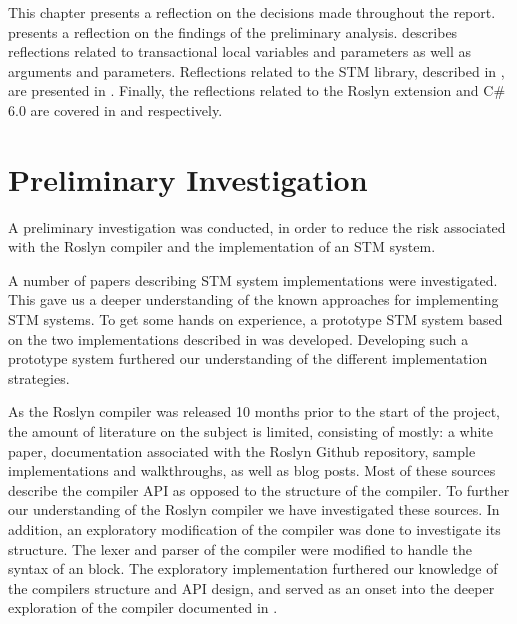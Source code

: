\makeatletter {}\makeatother
{}
\label{chap:reflection}
This chapter presents a reflection on the decisions made throughout the report.  presents a reflection on the findings of the preliminary analysis.  describes reflections related to transactional local variables and parameters as well as  arguments and parameters. Reflections related to the \ac{STM} library, described in , are presented in . Finally, the reflections related to the Roslyn extension and C\# 6.0 are covered in  and  respectively.

\section{Preliminary Investigation}\label{sec:reflection_preliminary}
A preliminary investigation was conducted, in order to reduce the risk associated with the Roslyn compiler and the implementation of an \ac{STM} system.

A number of papers describing \ac{STM} system implementations were investigated. This gave us a deeper understanding of the known approaches for implementing \ac{STM} systems. To get some hands on experience, a prototype \ac{STM} system based on the two implementations described in \cite[p. 424]{herlihy2012art} was developed. Developing such a prototype system furthered our understanding of the different implementation strategies.

As the Roslyn compiler was released 10 months prior to the start of the project, the amount of literature on the subject is limited, consisting of mostly: a white paper\cite{ng2012roslyn}, documentation associated with the Roslyn Github repository\cite{roslynwiki}, sample implementations and walkthroughs\cite{roslynsamples}, as well as blog posts. Most of these sources describe the compiler \ac{API} as opposed to the structure of the compiler. To further our understanding of the Roslyn compiler we have investigated these sources. In addition, an exploratory modification of the compiler was done to investigate its structure. The lexer and parser of the compiler were modified to handle the syntax of an  block. The exploratory implementation furthered our knowledge of the compilers structure and \ac{API} design, and served as an onset into the deeper exploration of the compiler documented in .

